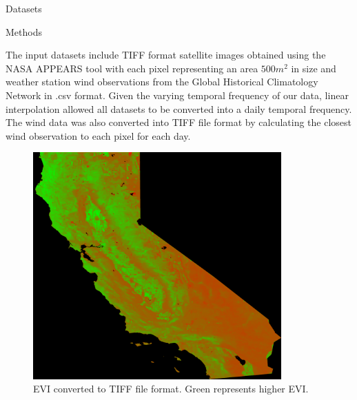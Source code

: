 \documentclass[final]{beamer}
\newlength{\colwidth}
\begin{document}
\begin{frame}[t]
\begin{columns}[t]
\begin{column}{\colwidth}
\begin{alertblock}{Datasets}
  \end{alertblock}

  \begin{block}{Methods}

     The input datasets include TIFF format satellite images obtained using the NASA APPEARS tool with each pixel representing an area $ 500m^2 $ in size and weather station wind observations from the Global Historical Climatology Network in .csv format. Given the varying temporal frequency of our data, linear interpolation allowed all datasets to be converted into a daily temporal frequency. The wind data was also converted into TIFF file format by calculating the closest wind observation to each pixel for each day. 

    
    \begin{figure}
    \centering
    \begin{minipage}{0.5\textwidth}
        \centering
        \includegraphics[width=0.85\textwidth]{images/2DCAEVI.png}
        \caption{EVI converted to TIFF file format. Green represents higher EVI.}
        \label{fig:CAEVI.png}
    \end{minipage}%
    \begin{minipage}{0.5\textwidth}
        \centering

\end{minipage}
\end{figure}
\end{block}
\end{column}
\end{columns}
\end{frame}
\end{document}
